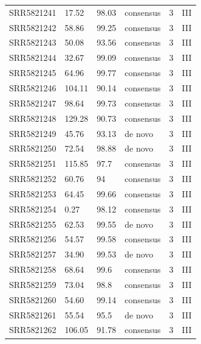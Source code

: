 \begin{longtable}{@{}llllll@{}}
SRR5821241 & 17.52         & 98.03       & consensus    & 3        & III      \\
SRR5821242 & 58.86         & 99.25       & consensus    & 3        & III      \\
SRR5821243 & 50.08         & 93.56       & consensus    & 3        & III      \\
SRR5821244 & 32.67         & 99.09       & consensus    & 3        & III      \\
SRR5821245 & 64.96         & 99.77       & consensus    & 3        & III      \\
SRR5821246 & 104.11        & 90.14       & consensus    & 3        & III      \\
SRR5821247 & 98.64         & 99.73       & consensus    & 3        & III      \\
SRR5821248 & 129.28        & 90.73       & consensus    & 3        & III      \\
SRR5821249 & 45.76         & 93.13       & de novo      & 3        & III      \\
SRR5821250 & 72.54         & 98.88       & de novo      & 3        & III      \\
SRR5821251 & 115.85        & 97.7        & consensus    & 3        & III      \\
SRR5821252 & 60.76         & 94          & consensus    & 3        & III      \\
SRR5821253 & 64.45         & 99.66       & consensus    & 3        & III      \\
SRR5821254 & 0.27          & 98.12       & consensus    & 3        & III      \\
SRR5821255 & 62.53         & 99.55       & de novo      & 3        & III      \\
SRR5821256 & 54.57         & 99.58       & consensus    & 3        & III      \\
SRR5821257 & 34.90         & 99.53       & de novo      & 3        & III      \\
SRR5821258 & 68.64         & 99.6        & consensus    & 3        & III      \\
SRR5821259 & 73.04         & 98.8        & consensus    & 3        & III      \\
SRR5821260 & 54.60         & 99.14       & consensus    & 3        & III      \\
SRR5821261 & 55.54         & 95.5        & de novo      & 3        & III      \\
SRR5821262 & 106.05        & 91.78       & consensus    & 3        & III     
\end{longtable}

